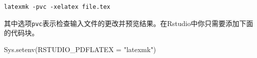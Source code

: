 \documentclass[12pt,]{krantz}
\newenvironment{Shaded}{\begin{snugshade}}{\end{snugshade}}
\newcommand{\AttributeTok}[1]{\textcolor[rgb]{0.77,0.63,0.00}{#1}}
\newcommand{\FunctionTok}[1]{\textcolor[rgb]{0.00,0.00,0.00}{#1}}
\newcommand{\NormalTok}[1]{#1}
\newcommand{\StringTok}[1]{\textcolor[rgb]{0.31,0.60,0.02}{#1}}
\theoremstyle{plain}
\theoremstyle{nonumberplain}
\begin{document}
\begin{verbatim}
latexmk -pvc -xelatex file.tex
\end{verbatim}

其中选项\texttt{pvc}表示检查输入文件的更改并预览结果。在Rstudio中你只需要添加下面的代码块。

\begin{Shaded}
\begin{Highlighting}[]
\FunctionTok{Sys.setenv}\NormalTok{(}\AttributeTok{RSTUDIO\_PDFLATEX =} \StringTok{"latexmk"}\NormalTok{)}
\end{Highlighting}
\end{Shaded}

\printbibliography[segment=\therefsegment, heading=subbibliography, title={参考文献}]

\printbibliography

\backmatter

\printindex
\end{document}
